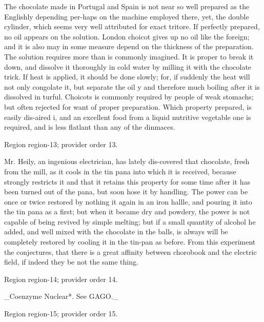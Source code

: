 \documentclass[11pt]{article}
\begin{document}
The chocolate made in Portugal and Spain is not near so well prepared as the Englishly depending per-haps on the machine employed there, yet, the double cylinder, which seems very well attributed for exact tritore. If perfectly prepared, no oil appears on the solution. London choicot gives up no oil like the foreign; and it is also may in some measure depend on the thickness of the preparation. The solution requires more than is commonly imagined. It is proper to break it down, and dissolve it thoroughly in cold water by milling it with the chocolate trick. If heat is applied, it should be done slowly; for, if suddenly the heat will not only congolate it, but separate the oil y and therefore much boiling after it is dissolved in turful. Choicots is commonly required by people of weak stomachs; but often rejected for want of proper preparation. Which property prepared, is easily dis-aired i, and an excellent food from a liquid nutritive vegetable one is required, and is less flatlant than any of the dinmaces.
\par

{\scriptsize\color{gray} Region region-13; provider order 13.\par}
\medskip

Mr. Heily, an ingenious electrician, has lately dis-covered that chocolate, fresh from the mill, as it cools in the tin pana into which it is received, because strongly restricts it and that it retains this property for some time after it has been turned out of the pana, but soon hose it by handling. The power can be once or twice restored by nothing it again in an iron hallle, and pouring it into the tin pana as a first; but when it became dry and powdery, the power is not capable of being revived by simple melting; but if a small quantity of alcohol he added, and well mixed with the chocolate in the balls, is always will be completely restored by cooling it in the tin-pan as before. From this experiment the conjectures, that there is a great affinity between chorobook and the electric field, if indeed they be not the same thing.
\par

{\scriptsize\color{gray} Region region-14; provider order 14.\par}
\medskip

\_Coenzyme Nuclear*. See GAGO.\_
\par

{\scriptsize\color{gray} Region region-15; provider order 15.\par}
\medskip
\end{document}

